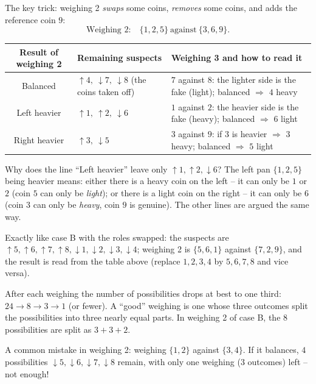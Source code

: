 {The key trick: weighing 2 \emph{swaps} some coins, \emph{removes} some coins, and adds the reference coin $9$:
\[ \text{Weighing 2:}\quad \{1, 2, 5\} \ \text{against}\ \{3, 6, 9\}. \]
\begin{center}\footnotesize
\begin{tabular}{|c|p{3.6cm}|p{6.4cm}|}
\hline
\rowcolor{tmBlue!10} Result of weighing 2 & Remaining suspects & Weighing 3 and how to read it\\ \hline
Balanced & $\uparrow 4,\ \downarrow 7,\ \downarrow 8$ (the coins taken off) & $7$ against $8$: the lighter side is the fake (light);
balanced $\Rightarrow$ $4$ heavy\\ \hline
Left heavier & $\uparrow 1,\ \uparrow 2,\ \downarrow 6$ & $1$ against $2$: the heavier side is the fake (heavy); balanced
$\Rightarrow$ $6$ light\\ \hline
Right heavier & $\uparrow 3,\ \downarrow 5$ & $3$ against $9$: if $3$ is heavier $\Rightarrow$ $3$ heavy; balanced
$\Rightarrow$ $5$ light\\ \hline
\end{tabular}
\end{center}
\begin{proofbox}Why does the line ``Left heavier'' leave only $\uparrow 1, \uparrow 2, \downarrow 6$? The left pan $\{1, 2, 5\}$ being
heavier means: either there is a heavy coin on the left -- it can only be $1$ or $2$ (coin $5$ can only be \emph{light}); or there is a
light coin on the right -- it can only be $6$ (coin $3$ can only be \emph{heavy}, coin $9$ is genuine). The other lines are argued the
same way.\end{proofbox}
Exactly like case B with the roles swapped: the suspects are $\uparrow 5, \uparrow 6, \uparrow 7, \uparrow 8, \downarrow 1,
\downarrow 2, \downarrow 3, \downarrow 4$; weighing 2 is $\{5, 6, 1\}$ against $\{7, 2, 9\}$, and the result is read from the table above
(replace $1, 2, 3, 4$ by $5, 6, 7, 8$ and vice versa).
\begin{tipbox}After each weighing the number of possibilities drops at best to one third: $24 \to 8 \to 3 \to 1$ (or fewer). A ``good''
weighing is one whose three outcomes split the possibilities into three nearly equal parts. In weighing 2 of case B, the $8$
possibilities are split as $3 + 3 + 2$.\end{tipbox}
\begin{warnbox}A common mistake in weighing 2: weighing $\{1, 2\}$ against $\{3, 4\}$. If it balances, $4$ possibilities
$\downarrow 5, \downarrow 6, \downarrow 7, \downarrow 8$ remain, with only one weighing ($3$ outcomes) left -- not enough!\end{warnbox}
}

